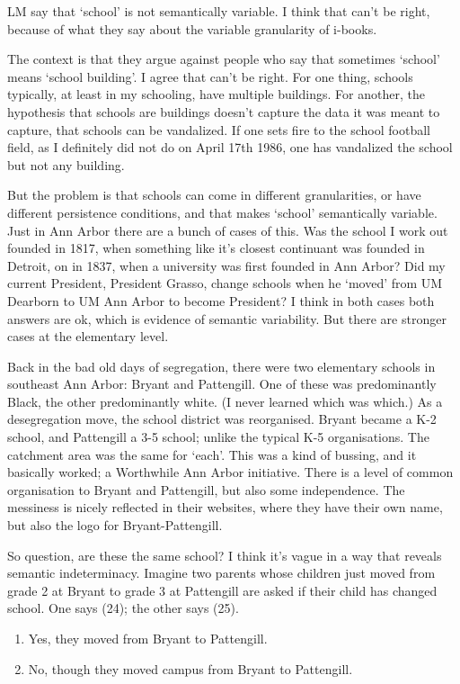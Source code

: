 \documentclass[
  11pt,
  letterpaper,
  DIV=11,
  numbers=noendperiod,
  twoside]{scrartcl}
\providecommand{\tightlist}{%
  \setlength{\itemsep}{0pt}\setlength{\parskip}{0pt}}
\begin{document}
LM say that `school' is not semantically variable. I think that can't be
right, because of what they say about the variable granularity of
i-books.

The context is that they argue against people who say that sometimes
`school' means `school building'. I agree that can't be right. For one
thing, schools typically, at least in my schooling, have multiple
buildings. For another, the hypothesis that schools are buildings
doesn't capture the data it was meant to capture, that schools can be
vandalized. If one sets fire to the school football field, as I
definitely did not do on April 17th 1986, one has vandalized the school
but not any building.

But the problem is that schools can come in different granularities, or
have different persistence conditions, and that makes `school'
semantically variable. Just in Ann Arbor there are a bunch of cases of
this. Was the school I work out founded in 1817, when something like
it's closest continuant was founded in Detroit, on in 1837, when a
university was first founded in Ann Arbor? Did my current President,
President Grasso, change schools when he `moved' from UM Dearborn to UM
Ann Arbor to become President? I think in both cases both answers are
ok, which is evidence of semantic variability. But there are stronger
cases at the elementary level.

Back in the bad old days of segregation, there were two elementary
schools in southeast Ann Arbor: Bryant and Pattengill. One of these was
predominantly Black, the other predominantly white. (I never learned
which was which.) As a desegregation move, the school district was
reorganised. Bryant became a K-2 school, and Pattengill a 3-5 school;
unlike the typical K-5 organisations. The catchment area was the same
for `each'. This was a kind of bussing, and it basically worked; a
Worthwhile Ann Arbor initiative. There is a level of common organisation
to Bryant and Pattengill, but also some independence. The messiness is
nicely reflected in their websites, where they have their own name, but
also the logo for Bryant-Pattengill.

So question, are these the same school? I think it's vague in a way that
reveals semantic indeterminacy. Imagine two parents whose children just
moved from grade 2 at Bryant to grade 3 at Pattengill are asked if their
child has changed school. One says (24); the other says (25).

\begin{enumerate}
\def\labelenumi{(\arabic{enumi})}
\setcounter{enumi}{23}
\tightlist
\item
  Yes, they moved from Bryant to Pattengill.
\item
  No, though they moved campus from Bryant to Pattengill.
\end{enumerate}
\end{document}
